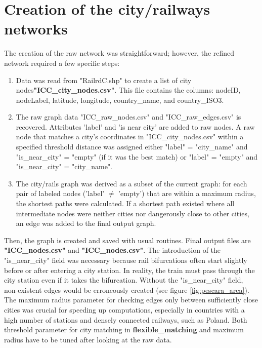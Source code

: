 \section{Creation of the city/railways networks}
The creation of the raw network was straightforward; however, the refined network required a few specific steps:
\begin{enumerate}
\item Data was read from "RailrdC.shp" to create a list of city nodes\textbf{"{ICC}\_city\_nodes.csv"}. This file contains the columns: nodeID, nodeLabel, latitude, longitude, country\_name, and country\_ISO3.
\item The raw graph data "{ICC}\_raw\_nodes.csv" and "{ICC}\_raw\_edges.csv" is recovered. Attributes 'label' and 'is near city' are added to raw nodes. A raw node that matches a city's coordinates in "{ICC}\_city\_nodes.csv" within a specified threshold distance was assigned either "label" = "city\_name" and "is\_near\_city" = "empty" (if it was the best match) or "label" = "empty" and "is\_near\_city" = "city\_name".
\item The city/rails graph was derived as a subset of the current graph: for each pair of labeled nodes ('label' $\neq$ 'empty') that are within a maximum radius, the shortest paths were calculated. If a shortest path existed where all intermediate nodes were neither cities nor dangerously close to other cities, an edge was added to the final output graph.
\end{enumerate}
Then, the graph is created and saved with usual routines. Final output files are \textbf{"{ICC}\_nodes.csv"} and \textbf{"{ICC}\_nodes.csv"}.
\medskip \newline
The introduction of the "is\_near\_city" field was necessary because rail bifurcations often start slightly before or after entering a city station. In reality, the train must pass through the city station even if it takes the bifurcation. Without the "is\_near\_city" field, non-existent edges would be erroneously created (see figure \ref{fig:pescara_area}). The maximum radius parameter for checking edges only between sufficiently close cities was crucial for speeding up computations, especially in countries with a high number of stations and densely connected railways, such as Poland. Both threshold parameter for city matching in \textbf{flexible\_matching} and maximum radius have to be tuned after looking at the raw data.
